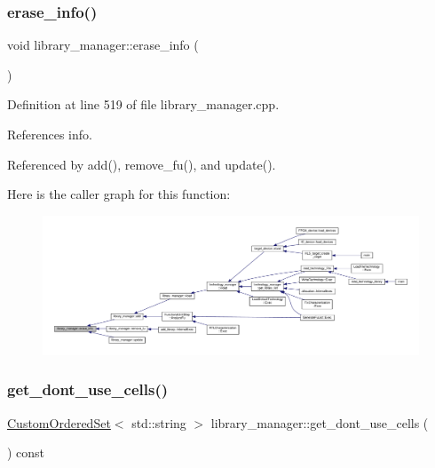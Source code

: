 \subsubsection{\texorpdfstring{erase\+\_\+info()}{erase\_info()}}
{\footnotesize\ttfamily void library\+\_\+manager\+::erase\+\_\+info (\begin{DoxyParamCaption}{ }\end{DoxyParamCaption})}



Definition at line 519 of file library\+\_\+manager.\+cpp.



References info.



Referenced by add(), remove\+\_\+fu(), and update().

Here is the caller graph for this function\+:
\nopagebreak
\begin{figure}[H]
\begin{center}
\leavevmode
\includegraphics[width=350pt]{d8/d35/classlibrary__manager_aceba51458eebf43796ae8e9555410738_icgraph}
\end{center}
\end{figure}
\mbox{\label{classlibrary__manager_a6906feae6af8bf096f52848de12479fa}} 
\subsubsection{\texorpdfstring{get\+\_\+dont\+\_\+use\+\_\+cells()}{get\_dont\_use\_cells()}}
{\footnotesize\ttfamily \hyperlink{classCustomOrderedSet}{Custom\+Ordered\+Set}$<$ std\+::string $>$ library\+\_\+manager\+::get\+\_\+dont\+\_\+use\+\_\+cells (\begin{DoxyParamCaption}{ }\end{DoxyParamCaption}) const}



